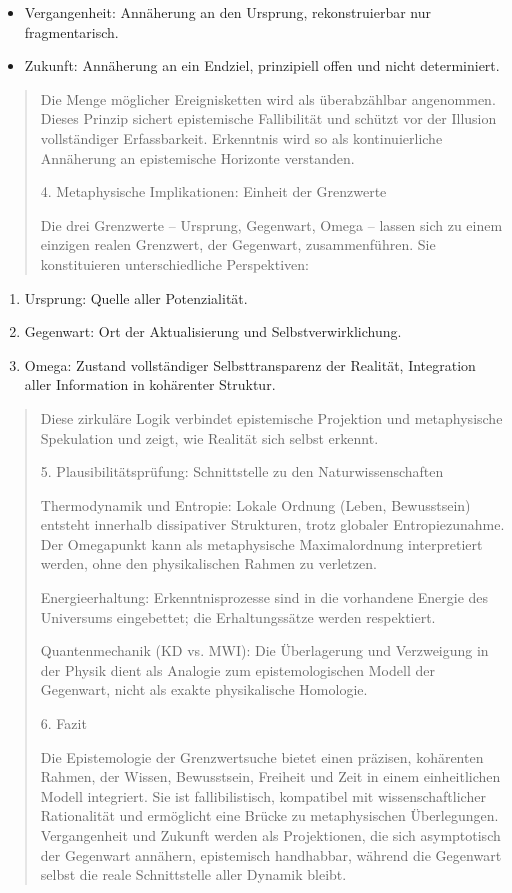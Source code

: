 \documentclass[
  ngerman,
]{article}
\begin{document}
\begin{itemize}
\item
  Vergangenheit: Annäherung an den Ursprung, rekonstruierbar nur
  fragmentarisch.
\item
  Zukunft: Annäherung an ein Endziel, prinzipiell offen und nicht
  determiniert.
\end{itemize}

\begin{quote}
Die Menge möglicher Ereignisketten wird als überabzählbar angenommen.
Dieses Prinzip sichert epistemische Fallibilität und schützt vor der
Illusion vollständiger Erfassbarkeit. Erkenntnis wird so als
kontinuierliche Annäherung an epistemische Horizonte verstanden.

4. Metaphysische Implikationen: Einheit der Grenzwerte

Die drei Grenzwerte -- Ursprung, Gegenwart, Omega -- lassen sich zu
einem einzigen realen Grenzwert, der Gegenwart, zusammenführen. Sie
konstituieren unterschiedliche Perspektiven:
\end{quote}

\begin{enumerate}
\def\labelenumi{\arabic{enumi}.}
\item
  Ursprung: Quelle aller Potenzialität.
\item
  Gegenwart: Ort der Aktualisierung und Selbstverwirklichung.
\item
  Omega: Zustand vollständiger Selbsttransparenz der Realität,
  Integration aller Information in kohärenter Struktur.
\end{enumerate}

\begin{quote}
Diese zirkuläre Logik verbindet epistemische Projektion und
metaphysische Spekulation und zeigt, wie Realität sich selbst erkennt.

5. Plausibilitätsprüfung: Schnittstelle zu den Naturwissenschaften

Thermodynamik und Entropie: Lokale Ordnung (Leben, Bewusstsein) entsteht
innerhalb dissipativer Strukturen, trotz globaler Entropiezunahme. Der
Omegapunkt kann als metaphysische Maximalordnung interpretiert werden,
ohne den physikalischen Rahmen zu verletzen.

Energieerhaltung: Erkenntnisprozesse sind in die vorhandene Energie des
Universums eingebettet; die Erhaltungssätze werden respektiert.

Quantenmechanik (KD vs. MWI): Die Überlagerung und Verzweigung in der
Physik dient als Analogie zum epistemologischen Modell der Gegenwart,
nicht als exakte physikalische Homologie.

6. Fazit

Die Epistemologie der Grenzwertsuche bietet einen präzisen, kohärenten
Rahmen, der Wissen, Bewusstsein, Freiheit und Zeit in einem
einheitlichen Modell integriert. Sie ist fallibilistisch, kompatibel mit
wissenschaftlicher Rationalität und ermöglicht eine Brücke zu
metaphysischen Überlegungen. Vergangenheit und Zukunft werden als
Projektionen, die sich asymptotisch der Gegenwart annähern, epistemisch
handhabbar, während die Gegenwart selbst die reale Schnittstelle aller
Dynamik bleibt.
\end{quote}
\end{document}
